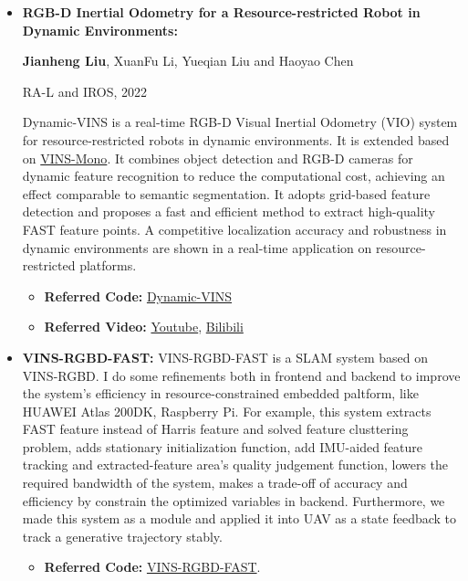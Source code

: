 \documentclass[11pt,a4paper,sans]{moderncv}        %
\begin{document}
{\begin{itemize}

\item \textbf{RGB-D Inertial Odometry for a Resource-restricted Robot in Dynamic Environments:} 

\textbf{Jianheng Liu}, XuanFu Li, Yueqian Liu and Haoyao Chen

RA-L and IROS, 2022

Dynamic-VINS is a real-time RGB-D Visual Inertial Odometry (VIO) system for resource-restricted robots in dynamic environments. It is extended based on \href{https://github.com/HKUST-Aerial-Robotics/VINS-Mono}{VINS-Mono}. It combines object detection and RGB-D cameras for dynamic feature recognition to reduce the computational cost, achieving an effect comparable to semantic segmentation. It adopts grid-based feature detection and proposes a fast and efficient method to extract high-quality FAST feature points. A competitive localization accuracy and robustness in dynamic environments are shown in a real-time application on  resource-restricted platforms.

\begin{itemize}
\item \textbf{Referred Code:} \href{https://github.com/HITSZ-NRSL/Dynamic-VINS.git}{Dynamic-VINS}
\item \textbf{Referred Video:} \href{https://youtu.be/y0U1IVtFBwY}{Youtube}, \href{https://www.bilibili.com/video/BV1bF411t7mx}{Bilibili}
\end{itemize}
\vspace{6pt}

\item \textbf{VINS-RGBD-FAST:} VINS-RGBD-FAST is a SLAM system based on VINS-RGBD. I do some refinements both in frontend and backend to improve the system's efficiency in resource-constrained embedded paltform, like HUAWEI Atlas 200DK, Raspberry Pi. For example, this system extracts FAST feature instead of Harris feature and solved feature clusttering problem, adds stationary initialization function, add IMU-aided feature tracking and extracted-feature area's quality judgement function, lowers the required bandwidth of the system, makes a trade-off of accuracy and efficiency by constrain the optimized variables in backend. Furthermore, we made this system as a module and applied it into UAV as a state feedback to track a generative trajectory stably. 

\begin{itemize}
\item \textbf{Referred Code:} \href{https://github.com/jianhengLiu/VINS-RGBD-FAST}{VINS-RGBD-FAST}.
\end{itemize}
\vspace{6pt}


\end{itemize}}
\end{document}
